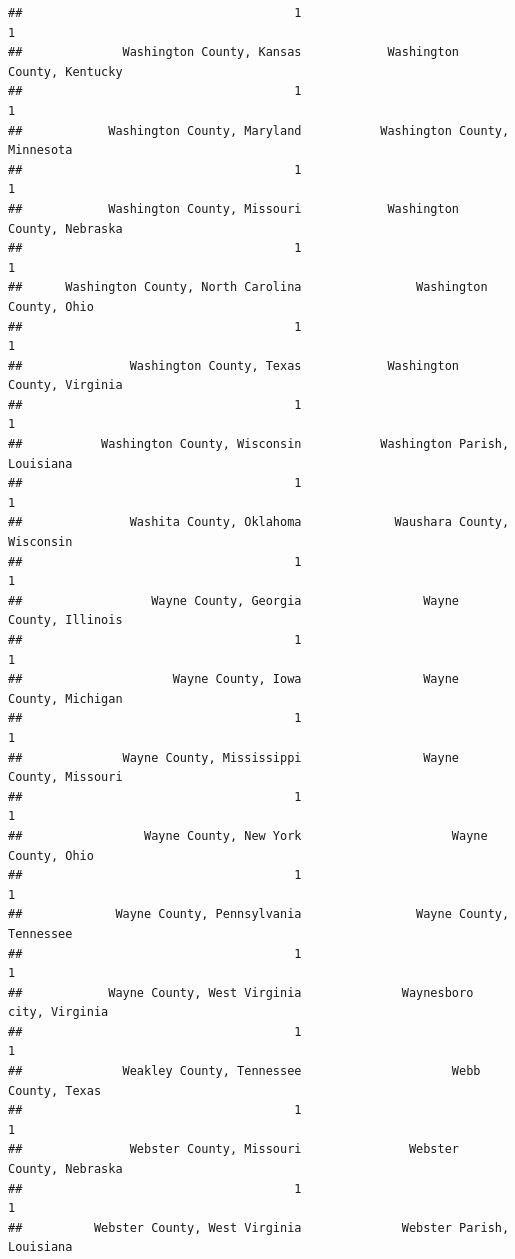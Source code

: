 \documentclass[
]{article}
\begin{document}
\begin{verbatim}
##                                      1                                      1 
##              Washington County, Kansas            Washington County, Kentucky 
##                                      1                                      1 
##            Washington County, Maryland           Washington County, Minnesota 
##                                      1                                      1 
##            Washington County, Missouri            Washington County, Nebraska 
##                                      1                                      1 
##      Washington County, North Carolina                Washington County, Ohio 
##                                      1                                      1 
##               Washington County, Texas            Washington County, Virginia 
##                                      1                                      1 
##           Washington County, Wisconsin           Washington Parish, Louisiana 
##                                      1                                      1 
##               Washita County, Oklahoma             Waushara County, Wisconsin 
##                                      1                                      1 
##                  Wayne County, Georgia                 Wayne County, Illinois 
##                                      1                                      1 
##                     Wayne County, Iowa                 Wayne County, Michigan 
##                                      1                                      1 
##              Wayne County, Mississippi                 Wayne County, Missouri 
##                                      1                                      1 
##                 Wayne County, New York                     Wayne County, Ohio 
##                                      1                                      1 
##             Wayne County, Pennsylvania                Wayne County, Tennessee 
##                                      1                                      1 
##            Wayne County, West Virginia              Waynesboro city, Virginia 
##                                      1                                      1 
##              Weakley County, Tennessee                     Webb County, Texas 
##                                      1                                      1 
##               Webster County, Missouri               Webster County, Nebraska 
##                                      1                                      1 
##          Webster County, West Virginia              Webster Parish, Louisiana 

\end{verbatim}
\end{document}
